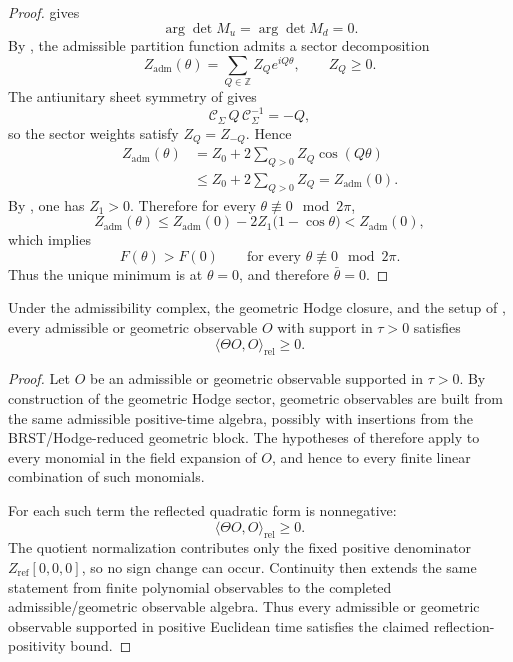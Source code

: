 
\begin{proof}
 gives
\[
\arg\det M_u=\arg\det M_d=0.
\]
By , the admissible partition function admits a sector
decomposition
\[
Z_{\mathrm{adm}}(\theta)=\sum_{Q\in\mathbb Z} Z_Q e^{iQ\theta},
\qquad
Z_Q\ge 0.
\]
The antiunitary sheet symmetry of  gives
\[
\mathcal C_\Sigma\,Q\,\mathcal C_\Sigma^{-1}=-Q,
\]
so the sector weights satisfy $Z_Q=Z_{-Q}$. Hence
\[
\begin{aligned}
Z_{\mathrm{adm}}(\theta)
&=Z_0+2\sum_{Q>0}Z_Q\cos(Q\theta)\\
&\le Z_0+2\sum_{Q>0}Z_Q
=Z_{\mathrm{adm}}(0).
\end{aligned}
\]
By , one has $Z_1>0$. Therefore for every
$\theta\not\equiv 0\mod 2\pi$,
\[
Z_{\mathrm{adm}}(\theta)
\le
Z_{\mathrm{adm}}(0)-2Z_1\bigl(1-\cos\theta\bigr)
<
Z_{\mathrm{adm}}(0),
\]
which implies
\[
F(\theta)>F(0)
\qquad
\text{for every }\theta\not\equiv 0\mod 2\pi.
\]
Thus the unique minimum is at $\theta=0$, and therefore $\bar\theta=0$.
\end{proof}

\begin{theorem}
\label{thm:reflection-positivity-admissible}
Under the admissibility complex, the geometric Hodge closure, and the setup of
, every admissible
or geometric observable $O$ with support in $\tau>0$ satisfies
\[
\langle \Theta O,O\rangle_{\mathrm{rel}}\ge 0.
\]
\end{theorem}

\begin{proof}
Let $O$ be an admissible or geometric observable supported in $\tau>0$. By construction of the
geometric Hodge sector, geometric observables are built from the same admissible positive-time
algebra, possibly with insertions from the BRST/Hodge-reduced geometric block. The hypotheses of
 therefore apply to every monomial in the field expansion
of $O$, and hence to every finite linear combination of such monomials.

For each such term the reflected quadratic form is nonnegative:
\[
\langle \Theta O,O\rangle_{\mathrm{rel}}\ge 0.
\]
The quotient normalization contributes only the fixed positive denominator
$Z_{\mathrm{ref}}[0,0,0]$, so no sign change can occur. Continuity then extends the same statement
from finite polynomial observables to the completed admissible/geometric observable algebra. Thus
every admissible or geometric observable supported in positive Euclidean time satisfies the claimed
reflection-positivity bound.
\end{proof}


